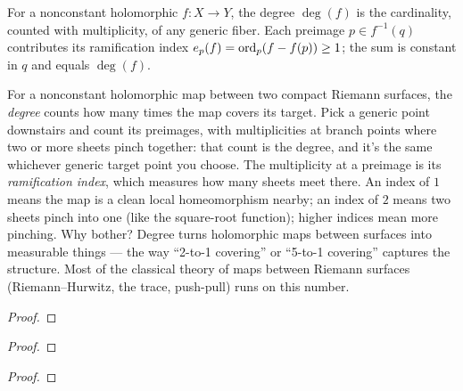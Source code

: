 \begin{definition}
\label{def:branched-degree}
For a nonconstant holomorphic \(f:X\to Y\), the degree \(\deg(f)\) is
the cardinality, counted with multiplicity, of any generic fiber. Each
preimage \(p\in f^{-1}(q)\) contributes its ramification index
\(e_p(f)=\operatorname{ord}_p(f - f(p))\ge 1\); the sum is constant in \(q\) and
equals \(\deg(f)\).
\leanok
\end{definition}

\begin{layman}
For a nonconstant holomorphic map between two compact Riemann surfaces,
the \emph{degree} counts how many times the map covers its target.
Pick a generic point downstairs and count its preimages, with
multiplicities at branch points where two or more sheets pinch together:
that count is the degree, and it's the same whichever generic target
point you choose. The multiplicity at a preimage is its
\emph{ramification index}, which measures how many sheets meet there. An
index of \(1\) means the map is a clean local homeomorphism nearby; an
index of \(2\) means two sheets pinch into one (like the square-root
function); higher indices mean more pinching. Why bother? Degree turns
holomorphic maps between surfaces into measurable things --- the way
``2-to-1 covering'' or ``5-to-1 covering'' captures the structure. Most
of the classical theory of maps between Riemann surfaces (Riemann--Hurwitz,
the trace, push-pull) runs on this number.
\end{layman}


\begin{proof}\leanok\end{proof}


\begin{proof}\leanok\end{proof}


\begin{proof}\leanok\end{proof}

